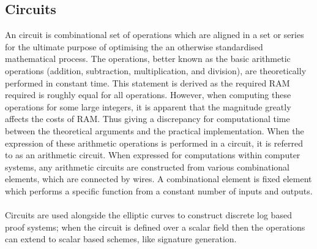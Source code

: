 \documentclass{article}
\begin{document}
\subsection{Circuits}
An circuit is combinational set of operations which are aligned in a set or series for the ultimate purpose of optimising the an otherwise standardised mathematical process. The operations, better known as the basic arithmetic operations (addition, subtraction, multiplication, and division), are theoretically performed in constant time. This statement is derived as the required RAM required is roughly equal for all operations. However, when computing these operations for some large integers, it is apparent that the magnitude greatly affects the costs of RAM. Thus giving a discrepancy for computational time between the theoretical arguments and the practical implementation. When the expression of these arithmetic operations is performed in a circuit, it is referred to as an arithmetic circuit. When expressed for computations within computer systems, any arithmetic circuits are constructed from various combinational elements, which are connected by wires. A combinational element is fixed element which performs a specific function from a constant number of inputs and outputs.\\\\ 
Circuits are used alongside the elliptic curves to construct discrete log based proof systems; when the circuit is defined over a scalar field then the operations can extend to scalar based schemes, like signature generation. 
\end{document}
